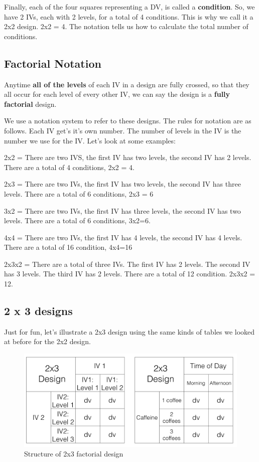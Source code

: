 \documentclass[]{book}
\begin{document}
Finally, each of the four squares representing a DV, is called a \textbf{condition}. So, we have 2 IVs, each with 2 levels, for a total of 4 conditions. This is why we call it a 2x2 design. 2x2 = 4. The notation tells us how to calculate the total number of conditions.

\hypertarget{factorial-notation}{%
\subsection{Factorial Notation}\label{factorial-notation}}

Anytime \textbf{all of the levels} of each IV in a design are fully crossed, so that they all occur for each level of every other IV, we can say the design is a \textbf{fully factorial} design.

We use a notation system to refer to these designs. The rules for notation are as follows. Each IV get's it's own number. The number of levels in the IV is the number we use for the IV. Let's look at some examples:

2x2 = There are two IVS, the first IV has two levels, the second IV has 2 levels. There are a total of 4 conditions, 2x2 = 4.

2x3 = There are two IVs, the first IV has two levels, the second IV has three levels. There are a total of 6 conditions, 2x3 = 6

3x2 = There are two IVs, the first IV has three levels, the second IV has two levels. There are a total of 6 conditions, 3x2=6.

4x4 = There are two IVs, the first IV has 4 levels, the second IV has 4 levels. There are a total of 16 condition, 4x4=16

2x3x2 = There are a total of three IVs. The first IV has 2 levels. The second IV has 3 levels. The third IV has 2 levels. There are a total of 12 condition. 2x3x2 = 12.

\hypertarget{x-3-designs}{%
\subsection{2 x 3 designs}\label{x-3-designs}}

Just for fun, let's illustrate a 2x3 design using the same kinds of tables we looked at before for the 2x2 design.

\begin{figure}
\centering
\includegraphics{figures/2x3Design.png}
\caption{\label{fig:923design}Structure of 2x3 factorial design}
\end{figure}
\end{document}
